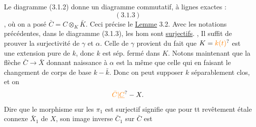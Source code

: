 Le diagramme (3.1.2) donne un diagramme commutatif, à lignes exactes :
\[(3.1.3)\]
,
où on a posé $\bar C=C\otimes_K\bar K$.  Ceci précise le
\uline{Lemme} 3.2. Avec les  notations précédentes, dans le diagramme (3.1.3), les  hom    sont \uline{surjectifs}.
, Il suffit de prouver la surjectivité de $\gamma$ et $\alpha$. Celle de $\gamma$ provient du fait que $K=\unsure{k(t)}$ est une extension  pure de $k$, donc   $k$ est sép. fermé dans $K$.
Notons maintenant que la flèche $\bar C\longrightarrow\bar X$ donnant naissance à $\alpha$ est la même que celle qui  en  faisant le changement de corps de base $k-\bar k$. Donc on peut supposer $k$ séparablement clos, et  on  
\[\unsure{\bar C|\underline C}-X.\]
Dire que le morphisme sur les $\pi_1$ est surjectif signifie que pour tt revêtement étale connexe $\bar X_1$ de $X$, son image inverse $\bar C_1$ sur $\bar C$ est
